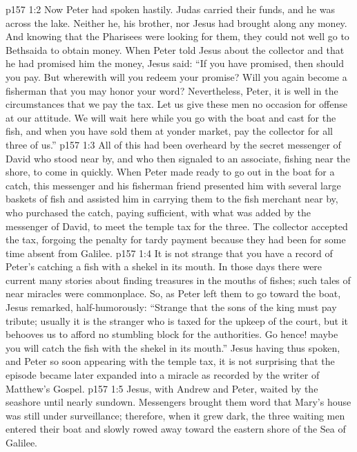 \vs p157 1:2 Now Peter had spoken hastily. Judas carried their funds, and he was across the lake. Neither he, his brother, nor Jesus had brought along any money. And knowing that the Pharisees were looking for them, they could not well go to Bethsaida to obtain money. When Peter told Jesus about the collector and that he had promised him the money, Jesus said: \textcolor{ubdarkred}{“If you have promised, then should you pay. But wherewith will you redeem your promise? Will you again become a fisherman that you may honor your word? Nevertheless, Peter, it is well in the circumstances that we pay the tax. Let us give these men no occasion for offense at our attitude. We will wait here while you go with the boat and cast for the fish, and when you have sold them at yonder market, pay the collector for all three of us.”}
\vs p157 1:3 All of this had been overheard by the secret messenger of David who stood near by, and who then signaled to an associate, fishing near the shore, to come in quickly. When Peter made ready to go out in the boat for a catch, this messenger and his fisherman friend presented him with several large baskets of fish and assisted him in carrying them to the fish merchant near by, who purchased the catch, paying sufficient, with what was added by the messenger of David, to meet the temple tax for the three. The collector accepted the tax, forgoing the penalty for tardy payment because they had been for some time absent from Galilee.\plusone
\vs p157 1:4 It is not strange that you have a record of Peter’s catching a fish with a shekel in its mouth. In those days there were current many stories about finding treasures in the mouths of fishes; such tales of near miracles were commonplace. So, as Peter left them to go toward the boat, Jesus remarked, half\hyp{}humorously: \textcolor{ubdarkred}{“Strange that the sons of the king must pay tribute; usually it is the stranger who is taxed for the upkeep of the court, but it behooves us to afford no stumbling block for the authorities. Go hence! maybe you will catch the fish with the shekel in its mouth.”} Jesus having thus spoken, and Peter so soon appearing with the temple tax, it is not surprising that the episode became later expanded into a miracle as recorded by the writer of Matthew’s Gospel.
\vs p157 1:5 Jesus, with Andrew and Peter, waited by the seashore until nearly sundown. Messengers brought them word that Mary’s house was still under surveillance; therefore, when it grew dark, the three waiting men entered their boat and slowly rowed away toward the eastern shore of the Sea of Galilee.
